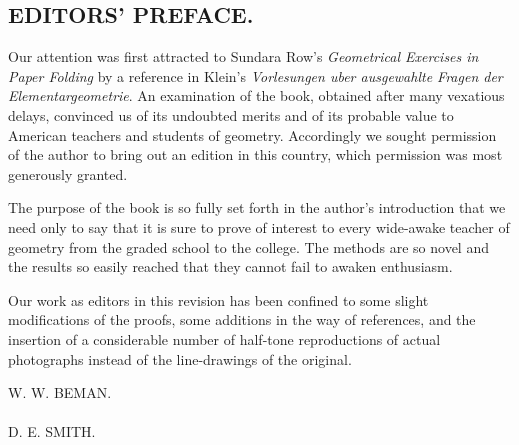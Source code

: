 \documentclass{book}[2021/07/26]
\begin{document}
\begin{frontmatter}
\chapter*{EDITORS' PREFACE.}

Our attention was first attracted to Sundara Row’s \emph{Geometrical Exercises
in Paper Folding} by a reference in Klein's \emph{Vorlesungen uber ausgewahlte
Fragen der Elementargeometrie}.  An examination of the book, obtained after many
vexatious delays, convinced us of its undoubted merits and of its probable value
to American teachers and students of geometry. Accordingly we sought permission
of the author to bring out an edition in this country, which permission was most
generously granted.

The purpose of the book is so fully set forth in the author's introduction that
we need only to say that it is sure to prove of interest to every wide-awake
teacher of geometry from the graded school to the college. The methods are so
novel and the results so easily reached that they cannot fail to awaken
enthusiasm.

Our work as editors in this revision has been confined to some slight
modifications of the proofs, some additions in the way of references, and the
insertion of a considerable number of half-tone reproductions of actual
photographs instead of the line-drawings of the original.


\begin{flushright}
{\large W. W. BEMAN. \mbox\qquad}\\ \\
{\large D. E. SMITH. \mbox\qquad}
\end{flushright}
\newpage





\tableofcontents
\end{frontmatter}
\end{document}
